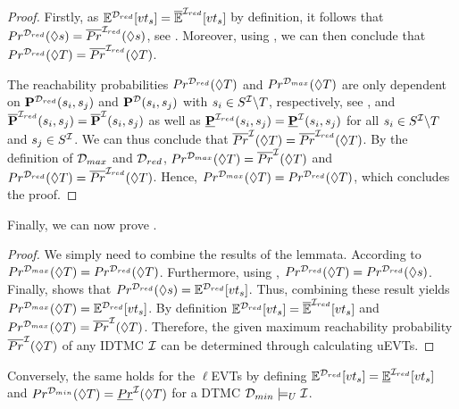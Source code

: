 \begin{proof}
    Firstly, as $\mathbb{E}^{\mathcal{D}_{red}}[vt_s] = \mathbb{\overline{E}}^{\mathcal{I}_{red}}[vt_s]$ by definition, it follows that $Pr^{\mathcal{D}_{red}}(\lozenge s) = \overline{Pr}^{\mathcal{I}_{red}}(\lozenge s)$, see . Moreover, using , we can then conclude that $Pr^{\mathcal{D}_{red}}(\lozenge T) = \overline{Pr}^{\mathcal{I}_{red}}(\lozenge T)$.

    The reachability probabilities $Pr^{\mathcal{D}_{red}}(\lozenge T)$ and $Pr^{\mathcal{D}_{max}}(\lozenge T)$ are only dependent on $\mathbf{P}^{\mathcal{D}_{red}}(s_i,s_j)$ and $\mathbf{P}^{\mathcal{D}}(s_i,s_j)$ with $s_i\in S^{\mathcal{I}}\backslash T$, respectively, see , and $\mathbf{\overline{P}}^{\mathcal{I}_{red}}(s_i,s_j) = \mathbf{\overline{P}}^{\mathcal{I}}(s_i,s_j)$ as well as $\mathbf{\underline{P}}^{\mathcal{I}_{red}}(s_i,s_j) = \mathbf{\underline{P}}^{\mathcal{I}}(s_i,s_j)$ for all $s_i\in S^{\mathcal{I}} \backslash T$ and $s_j\in S^{\mathcal{I}}$. We can thus conclude that $\overline{Pr}^{\mathcal{I}}(\lozenge T) = \overline{Pr}^{\mathcal{I}_{red}}(\lozenge T)$.
    By the definition of $\mathcal{D}_{max}$ and $\mathcal{D}_{red}$, $Pr^{\mathcal{D}_{max}}(\lozenge T) = \overline{Pr}^{\mathcal{I}}(\lozenge T)$ and $Pr^{\mathcal{D}_{red}}(\lozenge T) = \overline{Pr}^{\mathcal{I}_{red}}(\lozenge T)$. Hence, $Pr^{\mathcal{D}_{max}}(\lozenge T) = Pr^{\mathcal{D}_{red}}(\lozenge T)$, which concludes the proof.
\end{proof}

Finally, we can now prove .
\begin{proof}
    We simply need to combine the results of the lemmata. According to  $Pr^{\mathcal{D}_{max}}(\lozenge T) = Pr^{\mathcal{D}_{red}}(\lozenge T)$. Furthermore, using , $Pr^{\mathcal{D}_{red}}(\lozenge T) = Pr^{\mathcal{D}_{red}}(\lozenge s)$. Finally,  shows that $Pr^{\mathcal{D}_{red}}(\lozenge s) = \mathbb{E}^{\mathcal{D}_{red}}[vt_s]$. Thus, combining these result yields $Pr^{\mathcal{D}_{max}}(\lozenge T) = \mathbb{E}^{\mathcal{D}_{red}}[vt_s]$. By definition $\mathbb{E}^{\mathcal{D}_{red}}[vt_s] = \mathbb{\overline{E}}^{\mathcal{I}_{red}}[vt_s]$ and $Pr^{\mathcal{D}_{max}}(\lozenge T) = \overline{Pr}^{\mathcal{I}}(\lozenge T)$. Therefore, the given maximum reachability probability $\overline{Pr}^{\mathcal{I}}(\lozenge T)$ of any IDTMC $\mathcal{I}$ can be determined through calculating uEVTs.
\end{proof}

Conversely, the same holds for the $\ell$EVTs by defining $\mathbb{E}^{\mathcal{D}_{red}}[vt_s] = \mathbb{\underline{E}}^{\mathcal{I}_{red}}[vt_s]$ and $Pr^{\mathcal{D}_{min}}(\lozenge T) = \underline{Pr}^{\mathcal{I}}(\lozenge T)$ for a DTMC $\mathcal{D}_{min} \models_U \mathcal{I}$.

